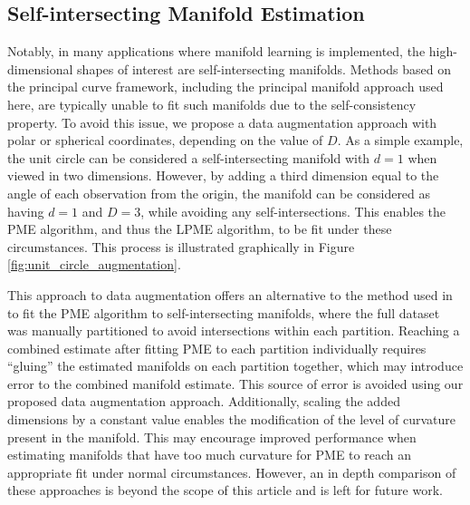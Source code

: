 \documentclass[11pt,reqno]{article}
\theoremstyle{definition}
\begin{document}
\subsection{Self-intersecting Manifold Estimation}\label{ss:selfInt}

Notably, in many applications where manifold learning is implemented, the high-dimensional shapes of interest are self-intersecting manifolds. Methods based on the principal curve framework, including the principal manifold approach used here, are typically unable to fit such manifolds due to the self-consistency property. To avoid this issue, we propose a data augmentation approach with polar or spherical coordinates, depending on the value of $D$. As a simple example, the unit circle can be considered a self-intersecting manifold with $d = 1$ when viewed in two dimensions. However, by adding a third dimension equal to the angle of each observation from the origin, the manifold can be considered as having $d = 1$ and $D = 3$, while avoiding any self-intersections. This enables the PME algorithm, and thus the LPME algorithm, to be fit under these circumstances. This process is illustrated graphically in Figure \ref{fig:unit_circle_augmentation}. 

This approach to data augmentation offers an alternative to the method used in \cite{mengPrincipalManifoldEstimation2021} to fit the PME algorithm to self-intersecting manifolds, where the full dataset was manually partitioned to avoid intersections within each partition. Reaching a combined estimate after fitting PME to each partition individually requires ``gluing'' the estimated manifolds on each partition together, which may introduce error to the combined manifold estimate. This source of error is avoided using our proposed data augmentation approach. Additionally, scaling the added dimensions by a constant value enables the modification of the level of curvature present in the manifold. This may encourage improved performance when estimating manifolds that have too much curvature for PME to reach an appropriate fit under normal circumstances. However, an in depth comparison of these approaches is beyond the scope of this article and is left for future work.
\end{document}
